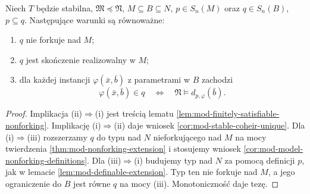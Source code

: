 \begin{wniosek}
\label{cor:mod-model-extension-equivalences}
Niech $T$ będzie stabilna,
$\mathfrak M\preccurlyeq\mathfrak N$,
$M\subseteq B\subseteq N$,
$p\in S_n(M)$ oraz $q\in S_n(B)$, $p\subseteq q$.
Następujące warunki są równoważne:
\begin{enumerate}[label=(\roman*)]
\item $q$ nie forkuje nad $M$;
\item $q$ jest skończenie realizowalny w $M$;
\item dla każdej instancji $\varphi(\bar x,\bar b)$
z parametrami w $B$ zachodzi
\[
\varphi(\bar x,\bar b)\in q
\quad\Longleftrightarrow\quad
\mathfrak N\models d_{p,\varphi}(\bar b).
\]
\end{enumerate}
\end{wniosek}
\begin{proof}
Implikacja (ii)$\Rightarrow$(i) jest treścią lematu
\ref{lem:mod-finitely-satisfiable-nonforking}.
Implikację (i)$\Rightarrow$(ii) daje wniosek
\ref{cor:mod-stable-coheir-unique}.
Dla (i)$\Rightarrow$(iii) rozszerzamy $q$ do typu
nad $N$ nieforkującego nad $M$ na mocy
twierdzenia \ref{thm:mod-nonforking-extension}
i stosujemy wniosek
\ref{cor:mod-model-nonforking-definitions}.
Dla (iii)$\Rightarrow$(i) budujemy typ nad $N$
za pomocą definicji $p$, jak w lemacie
\ref{lem:mod-definable-extension}.
Typ ten nie forkuje nad $M$, a jego ograniczenie
do $B$ jest równe $q$ na mocy (iii).
Monotoniczność daje tezę.
\end{proof}


